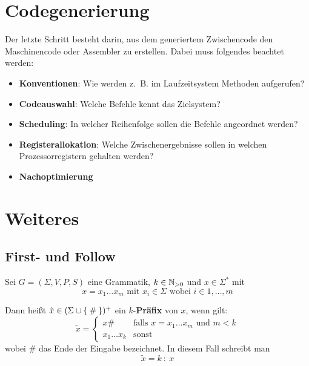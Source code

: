 \section{Codegenerierung}
Der letzte Schritt besteht darin, aus dem generiertem Zwischencode den 
Maschinencode oder Assembler zu erstellen. Dabei muss folgendes beachtet werden:
\begin{itemize}
    \item \textbf{Konventionen}: Wie werden z.~B. im Laufzeitsystem Methoden aufgerufen?
    \item \textbf{Codeauswahl}: Welche Befehle kennt das Zielsystem?
    \item \textbf{Scheduling}: In welcher Reihenfolge sollen die Befehle angeordnet werden?
    \item \textbf{Registerallokation}: Welche Zwischenergebnisse sollen in welchen Prozessorregistern gehalten werden?
    \item \textbf{Nachoptimierung}
\end{itemize}

\section{Weiteres}
\subsection{First- und Follow}
\begin{definition}[$k$-Anfang]%
    Sei $G = (\Sigma, V, P, S)$ eine Grammatik, $k \in \mathbb{N}_{> 0}$ und
    $x \in \Sigma^*$ mit
    \[x = x_1 \dots x_m \text{ mit } x_i \in \Sigma \text{ wobei } i \in 1, \dots, m\]

    Dann heißt $\tilde{x} \in (\Sigma \cup \Set{\#})^+$ ein $k$-\textbf{Präfix} von $x$,
    wenn gilt:
    \[\tilde{x} = 
    \begin{cases}
        x\#           &\text{falls } x = x_1 \dots x_m \text{ und } m < k\\
        x_1 \dots x_k &\text{sonst}
    \end{cases}\]
    wobei $\#$ das Ende der Eingabe bezeichnet. In diesem Fall schreibt man
    \[ \tilde{x} = k\ :\ x\]
\end{definition}

